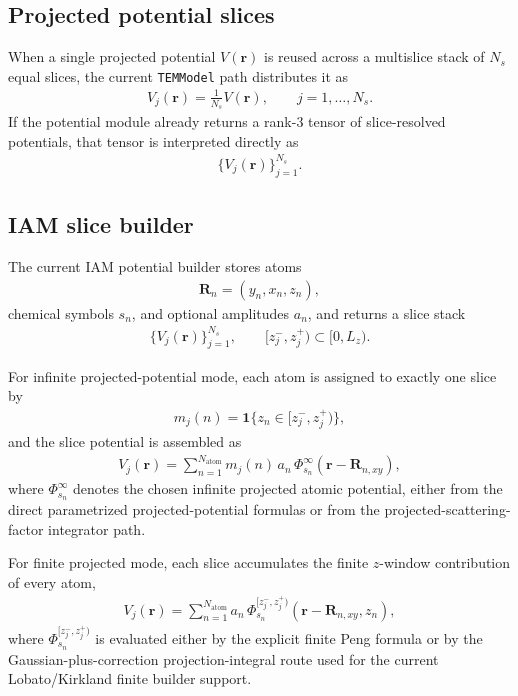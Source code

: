 \documentclass[11pt]{article}
\begin{document}
\subsection{Projected potential slices}
When a single projected potential $V(\mathbf{r})$ is reused across a multislice stack of
$N_s$ equal slices, the current \texttt{TEMModel} path distributes it as
\begin{align}
  V_j(\mathbf{r}) = \frac{1}{N_s}V(\mathbf{r}),
  \qquad j=1,\dots,N_s.
\end{align}
If the potential module already returns a rank-3 tensor of slice-resolved potentials,
that tensor is interpreted directly as
\begin{align}
  \{V_j(\mathbf{r})\}_{j=1}^{N_s}.
\end{align}

\subsection{IAM slice builder}
The current IAM potential builder stores atoms
\begin{align}
  \mathbf{R}_n = (y_n, x_n, z_n),
\end{align}
chemical symbols $s_n$, and optional amplitudes $a_n$, and returns a slice stack
\begin{align}
  \{V_j(\mathbf{r})\}_{j=1}^{N_s},
  \qquad
  [z_j^-, z_j^+) \subset [0, L_z).
\end{align}

For infinite projected-potential mode, each atom is assigned to exactly one slice by
\begin{align}
  m_j(n) = \mathbf{1}\{z_n \in [z_j^-, z_j^+)\},
\end{align}
and the slice potential is assembled as
\begin{align}
  V_j(\mathbf{r})
  = \sum_{n=1}^{N_{\mathrm{atom}}}
    m_j(n)\,a_n\,\Phi_{s_n}^{\infty}(\mathbf{r} - \mathbf{R}_{n,xy}),
\end{align}
where $\Phi_{s_n}^{\infty}$ denotes the chosen infinite projected atomic potential,
either from the direct parametrized projected-potential formulas or from the
projected-scattering-factor integrator path.

For finite projected mode, each slice accumulates the finite $z$-window contribution
of every atom,
\begin{align}
  V_j(\mathbf{r})
  = \sum_{n=1}^{N_{\mathrm{atom}}}
    a_n\,\Phi_{s_n}^{[z_j^-, z_j^+)}(\mathbf{r} - \mathbf{R}_{n,xy}, z_n),
\end{align}
where $\Phi_{s_n}^{[z_j^-, z_j^+)}$ is evaluated either by the explicit finite Peng
formula or by the Gaussian-plus-correction projection-integral route used for the
current Lobato/Kirkland finite builder support.
\end{document}
